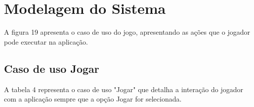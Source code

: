 \section{Modelagem do Sistema} 
\label{sec:modelagem-do-sistema}
A figura 19 apresenta o caso de uso do jogo, apresentando as ações que o jogador pode executar na aplicação.
\begin{figure}[h!] 
\centering 
{}  
\end{figure} 

\subsection{Caso de uso Jogar}
A tabela 4 representa o caso de uso "Jogar" que detalha a interação do jogador com a aplicação sempre que a opção Jogar for selecionada.

